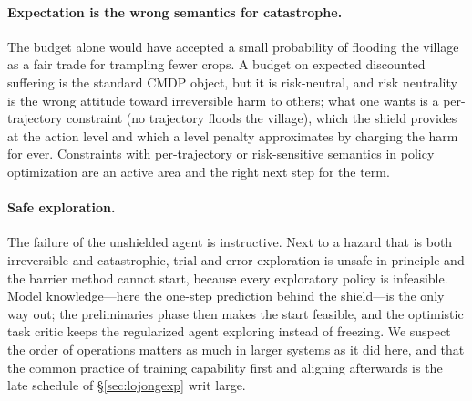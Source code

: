 \paragraph{Expectation is the wrong semantics for catastrophe.}
The budget alone would have accepted a small probability of flooding the village as a fair trade for trampling fewer crops.
A budget on expected discounted suffering is the standard CMDP object, but it is risk-neutral, and risk neutrality is the wrong attitude toward irreversible harm to others; what one wants is a per-trajectory constraint (no trajectory floods the village), which the shield provides at the action level and which a level penalty approximates by charging the harm for ever.
Constraints with per-trajectory or risk-sensitive semantics in policy optimization are an active area and the right next step for the \Metta{} term.

\paragraph{Safe exploration.}
The failure of the unshielded agent is instructive.
Next to a hazard that is both irreversible and catastrophic, trial-and-error exploration is unsafe in principle and the barrier method cannot start, because every exploratory policy is infeasible.
Model knowledge---here the one-step prediction behind the shield---is the only way out; the preliminaries phase then makes the start feasible, and the optimistic task critic keeps the regularized agent exploring instead of freezing.
We suspect the order of operations matters as much in larger systems as it did here, and that the common practice of training capability first and aligning afterwards is the late schedule of \S\ref{sec:lojongexp} writ large.

